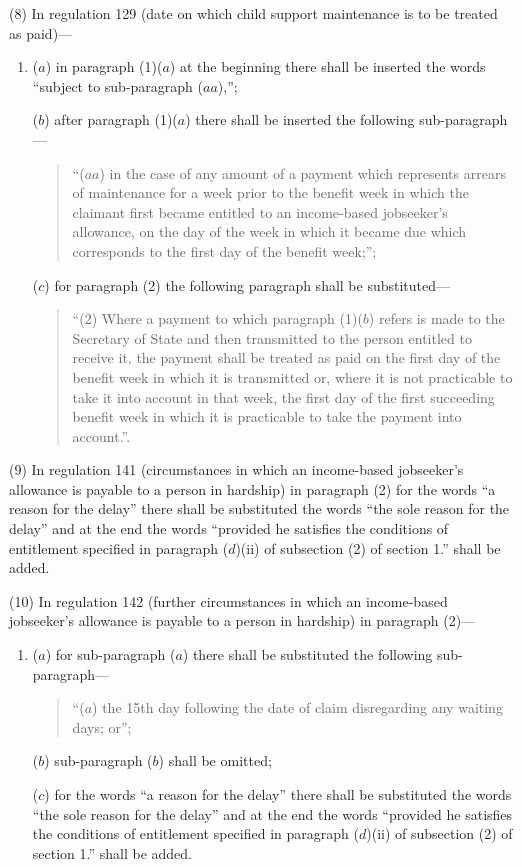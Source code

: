 \documentclass[a4paper]{article}
\begin{document}
(8) In regulation 129 (date on which child support maintenance is to be treated as paid)—
\begin{enumerate}\item[]
($a$) in paragraph (1)($a$) at the beginning there shall be inserted the words “subject to sub-paragraph ($aa$),”;

($b$) after paragraph (1)($a$) there shall be inserted the following sub-paragraph—
\begin{quotation}
“($aa$) in the case of any amount of a payment which represents arrears of maintenance for a week prior to the benefit week in which the claimant first became entitled to an income-based jobseeker’s allowance, on the day of the week in which it became due which corresponds to the first day of the benefit week;”;
\end{quotation}

($c$) for paragraph (2) the following paragraph shall be substituted—
\begin{quotation}
“(2) Where a payment to which paragraph (1)($b$) refers is made to the Secretary of State and then transmitted to the person entitled to receive it, the payment shall be treated as paid on the first day of the benefit week in which it is transmitted or, where it is not practicable to take it into account in that week, the first day of the first succeeding benefit week in which it is practicable to take the payment into account.”.
\end{quotation}
\end{enumerate}

(9) In regulation 141 (circumstances in which an income-based jobseeker’s allowance is payable to a person in hardship) in paragraph (2) for the words “a reason for the delay” there shall be substituted the words “the sole reason for the delay” and at the end the words “provided he satisfies the conditions of entitlement specified in paragraph ($d$)(ii) of subsection (2) of section 1.” shall be added.

(10) In regulation 142 (further circumstances in which an income-based jobseeker’s allowance is payable to a person in hardship) in paragraph (2)—
\begin{enumerate}\item[]
($a$) for sub-paragraph ($a$) there shall be substituted the following sub-paragraph—
\begin{quotation}
“($a$) the 15th day following the date of claim disregarding any waiting days; or”;
\end{quotation}

($b$) sub-paragraph ($b$) shall be omitted;

($c$) for the words “a reason for the delay” there shall be substituted the words “the sole reason for the delay” and at the end the words “provided he satisfies the conditions of entitlement specified in paragraph ($d$)(ii) of subsection (2) of section 1.” shall be added.
\end{enumerate}
\end{document}
